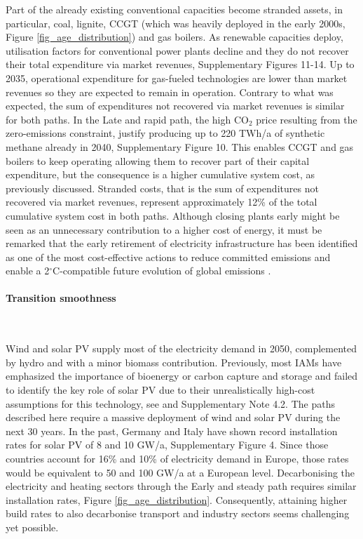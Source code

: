 \documentclass[5p]{elsarticle} %
\begin{document}
Part of the already existing conventional capacities become stranded assets, in particular, coal, lignite, CCGT (which was heavily deployed in the early 2000s, Figure \ref{fig_age_distribution}) and gas boilers. As renewable capacities deploy, utilisation factors for conventional power plants decline and they do not recover their total expenditure via market revenues, Supplementary Figures 11-14. Up to 2035, operational expenditure for gas-fueled technologies are lower than market revenues so they are expected to remain in operation. Contrary to what was expected, the sum of expenditures not recovered via market revenues is similar for both paths. In the Late and rapid path, the high CO$_2$ price resulting from the zero-emissions constraint, justify producing up to 220 TWh/a of synthetic methane already in 2040, Supplementary Figure 10. This enables CCGT and gas boilers to keep operating allowing them to recover part of their capital expenditure, but the consequence is a higher cumulative system cost, as previously discussed. Stranded costs, that is the sum of expenditures not recovered via market revenues, represent approximately 12\% of the total cumulative system cost in both paths. Although closing plants early might be seen as an unnecessary contribution to a higher cost of energy, it must be remarked that the early retirement of electricity infrastructure has been identified as one of the most cost-effective actions to reduce committed emissions and enable a 2$^{\circ}$C-compatible future evolution of global emissions \cite{Tong_2019}.


\paragraph{\textbf{Transition smoothness}} \


Wind and solar PV supply most of the electricity demand in 2050, complemented by hydro and with a minor biomass contribution. Previously, most IAMs have emphasized the importance of bioenergy or carbon capture and storage and failed to identify the key role of solar PV due to their unrealistically high-cost assumptions for this technology, see \cite{Creutzig_2017, Krey_2019} and Supplementary Note 4.2. The paths described here require a massive deployment of wind and solar PV during the next 30 years. In the past, Germany and Italy have shown record installation rates for solar PV of 8 and 10 GW/a, Supplementary Figure 4. Since those countries account for 16\% and 10\% of electricity demand in Europe, those rates would be equivalent to 50 and 100 GW/a at a European level. Decarbonising the electricity and heating sectors through the Early and steady path requires similar installation rates, Figure \ref{fig_age_distribution}. Consequently, attaining higher build rates to also decarbonise transport and industry sectors seems challenging yet possible. \\
\end{document}
